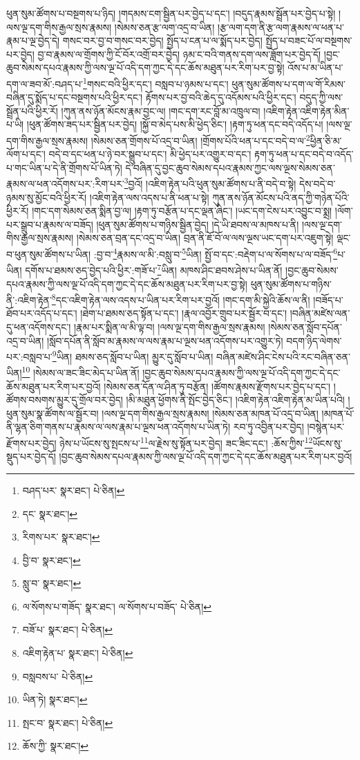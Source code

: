 ཕུན་སུམ་ཚོགས་པ་བསྔགས་པ་ཉིད། །གདམས་ངག་སྦྱིན་པར་བྱེད་པ་དང་། །བདུད་རྣམས་སྦྲོན་པར་བྱེད་པ་སྟེ། །ལས་ལྔ་དག་གིས་རྒྱལ་སྲས་རྣམས། །སེམས་ཅན་རྩ་ལག་འདྲ་བ་ཡིན། །རྩ་ལག་དག་ནི་རྩ་ལག་རྣམས་ལ་ཕན་པ་རྣམ་པ་ལྔ་བྱེད་དེ། གསང་བར་བྱ་བ་གསང་བར་བྱེད། སྤྱོད་པ་ངན་པ་ལ་སྨོད་པར་བྱེད། སྤྱོད་པ་བཟང་པོ་ལ་བསྔགས་པར་བྱེད། བྱ་བ་རྣམས་ལ་གྲོགས་ཀྱི་ངོ་བོར་འགྲོ་བར་བྱེད། ཉམ་ང་བའི་གནས་དག་ལས་ཟློག་པར་བྱེད་དོ། །བྱང་ཆུབ་སེམས་དཔའ་རྣམས་ཀྱི་ལས་ལྔ་པོ་འདི་དག་ཀྱང་དེ་དང་ཆོས་མཐུན་པར་རིག་པར་བྱ་སྟེ། འོས་པ་མ་ཡིན་པ་དག་ལ་ཟབ་མོ་:བཤད་པ་\footnote{བཤད་པར་  སྣར་ཐང་།  པེ་ཅིན། }གསང་བའི་ཕྱིར་དང་། བསླབ་པ་ཉམས་པ་དང་། ཕུན་སུམ་ཚོགས་པ་དག་ལ་གོ་རིམས་བཞིན་དུ་སྨོད་པ་དང་བསྔགས་པའི་ཕྱིར་དང་། རྟོགས་པར་བྱ་བའི་ཆེད་དུ་འདོམས་པའི་ཕྱིར་དང་། བདུད་ཀྱི་ལས་སྦྲོན་པའི་ཕྱིར་རོ། །ཀུན་ནས་ཉོན་མོངས་རྣམ་བྱང་ལ། །གང་དག་རང་བློ་མ་འཁྲུལ་བ། །འཇིག་རྟེན་འཇིག་རྟེན་མིན་པ་ཡི། །ཕུན་ཚོགས་ཟད་པར་སྦྱིན་པར་བྱེད། །སྐྱོ་བ་མེད་པས་མི་ཕྱེད་ཅིང་། །རྟག་ཏུ་ཕན་དང་བདེ་འདོད་པ། །ལས་ལྔ་དག་གིས་རྒྱལ་སྲས་རྣམས། །སེམས་ཅན་གྲོགས་པོ་འདྲ་བ་ཡིན། །གྲོགས་པོའི་ཕན་པ་དང་བདེ་བ་ལ་\footnote{དང་  སྣར་ཐང་། }ཕྱིན་ཅི་མ་ལོག་པ་དང་། བདེ་བ་དང་ཕན་པ་ཉེ་བར་སྒྲུབ་པ་དང་། མི་ཕྱེད་པར་འགྱུར་བ་དང་། རྟག་ཏུ་ཕན་པ་དང་བདེ་བ་འདོད་པ་གང་ཡིན་པ་དེ་ནི་གྲོགས་པོ་ཡིན་ཏེ། དེ་བཞིན་དུ་བྱང་ཆུབ་སེམས་དཔའ་རྣམས་ཀྱང་ལས་ལྔས་སེམས་ཅན་རྣམས་ལ་ཕན་འདོགས་པར་:རིག་པར་\footnote{རིགས་པར་  སྣར་ཐང་། }བྱའོ། །འཇིག་རྟེན་པའི་ཕུན་སུམ་ཚོགས་པ་ནི་བདེ་བ་སྟེ། དེས་བདེ་བ་ཉམས་སུ་མྱོང་བའི་ཕྱིར་རོ། །འཇིག་རྟེན་ལས་འདས་པ་ནི་ཕན་པ་སྟེ། ཀུན་ནས་ཉོན་མོངས་པའི་ནད་ཀྱི་གཉེན་པོའི་ཕྱིར་རོ། །གང་དག་སེམས་ཅན་སྨིན་བྱ་ལ། །རྟག་ཏུ་བརྩོན་པ་དང་ལྡན་ཞིང་། །ཡང་དག་ངེས་པར་འབྱུང་བ་སྨྲ། །ལོག་པར་སྒྲུབ་པ་རྣམས་ལ་བཟོད། །ཕུན་སུམ་ཚོགས་པ་གཉིས་སྦྱིན་བྱེད། །དེ་ཡི་ཐབས་ལ་མཁས་པ་ནི། །ལས་ལྔ་དག་གིས་རྒྱལ་སྲས་རྣམས། །སེམས་ཅན་བྲན་དང་འདྲ་བ་ཡིན། བྲན་ནི་ཇོ་བོ་ལ་ལས་ལྔས་ཡང་དག་པར་འཇུག་སྟེ། ལྡང་བ་ཕུན་སུམ་ཚོགས་པ་ཡིན། :བྱ་བ་\footnote{བྱི་བ་  སྣར་ཐང་། }རྣམས་ལ་མི་:བསླུ་བ་\footnote{སླུ་བ་  སྣར་ཐང་། }ཡིན། སྤྱོ་བ་དང་:བརྡེག་པ་ལ་སོགས་པ་ལ་བཟོད་\footnote{ལ་སོགས་པ་གཟོད་  སྣར་ཐང་། ལ་སོགས་པ་བཟོད་  པེ་ཅིན། }པ་ཡིན། དགོས་པ་ཐམས་ཅད་བྱེད་པའི་ཕྱིར་:གཟོ་པ་\footnote{བཟོ་པ་  སྣར་ཐང་།  པེ་ཅིན། }ཡིན། མཁས་ཤིང་ཐབས་ཤེས་པ་ཡིན་ནོ། །བྱང་ཆུབ་སེམས་དཔའ་རྣམས་ཀྱི་ལས་ལྔ་པོ་འདི་དག་ཀྱང་དེ་དང་ཆོས་མཐུན་པར་རིག་པར་བྱ་སྟེ། ཕུན་སུམ་ཚོགས་པ་གཉིས་ནི་:འཇིག་རྟེན་\footnote{འཇིག་རྟེན་པ་  སྣར་ཐང་།  པེ་ཅིན། }དང་འཇིག་རྟེན་ལས་འདས་པ་ཡིན་པར་རིག་པར་བྱའོ། །གང་དག་མི་སྐྱེའི་ཆོས་ལ་ནི། །བཟོད་པ་ཐོབ་པར་འདོད་པ་དང་། །ཐེག་པ་ཐམས་ཅད་སྟོན་པ་དང་། །རྣལ་འབྱོར་གྲུབ་པར་སྦྱོར་བ་དང་། །བཞིན་མཛེས་ལན་དུ་ཕན་འདོགས་དང་། །རྣམ་པར་སྨིན་ལ་མི་ལྟ་བ། །ལས་ལྔ་དག་གིས་རྒྱལ་སྲས་རྣམས། །སེམས་ཅན་སློབ་དཔོན་འདྲ་བ་ཡིན། །སློབ་དཔོན་ནི་སློབ་མ་རྣམས་ལ་ལས་རྣམ་པ་ལྔས་ཕན་འདོགས་པར་འགྱུར་ཏེ། བདག་ཉིད་ལེགས་པར་:བསླབ་པ་\footnote{བསླབས་པ་  པེ་ཅིན། }ཡིན། ཐམས་ཅད་སློབ་པ་ཡིན། མྱུར་དུ་སློབ་པ་ཡིན། བཞིན་མཛེས་ཤིང་ངེས་པའི་རང་བཞིན་ཅན་ཡིན།\footnote{ཡིན་ཏེ།  སྣར་ཐང་། } །སེམས་ལ་ཟང་ཟིང་མེད་པ་ཡིན་ནོ། །བྱང་ཆུབ་སེམས་དཔའ་རྣམས་ཀྱི་ལས་ལྔ་པོ་འདི་དག་ཀྱང་དེ་དང་ཆོས་མཐུན་པར་རིག་པར་བྱའོ། །སེམས་ཅན་དོན་ལ་ཤིན་ཏུ་བརྩོན། །ཚོགས་རྣམས་རྫོགས་པར་བྱེད་པ་དང་། །ཚོགས་བསགས་མྱུར་དུ་གྲོལ་བར་བྱེད། །མི་མཐུན་ཕྱོགས་ནི་སྤོང་བྱེད་ཅིང་། །འཇིག་རྟེན་འཇིག་རྟེན་མ་ཡིན་པའི། །ཕུན་སུམ་སྣ་ཚོགས་ལ་སྦྱོར་བ། །ལས་ལྔ་དག་གིས་རྒྱལ་སྲས་རྣམས། །སེམས་ཅན་མཁན་པོ་འདྲ་བ་ཡིན། །མཁན་པོ་ནི་ལྷན་ཅིག་གནས་པ་རྣམས་ལ་ལས་རྣམ་པ་ལྔས་ཕན་འདོགས་པ་ཡིན་ཏེ། རབ་ཏུ་འབྱིན་པར་བྱེད། །བསྙེན་པར་རྫོགས་པར་བྱེད། ཉེས་པ་ཡོངས་སུ་སྤངས་པ་\footnote{སྤང་བ་  སྣར་ཐང་།  པེ་ཅིན། }ལ་རྗེས་སུ་སྟོན་པར་བྱེད། ཟང་ཟིང་དང་། :ཆོས་ཀྱིས་\footnote{ཆོས་ཀྱི་  སྣར་ཐང་། }ཡོངས་སུ་སྡུད་པར་བྱེད་དོ། །བྱང་ཆུབ་སེམས་དཔལ་རྣམས་ཀྱི་ལས་ལྔ་པོ་འདི་དག་ཀྱང་དེ་དང་ཆོས་མཐུན་པར་རིག་པར་བྱའོ། 